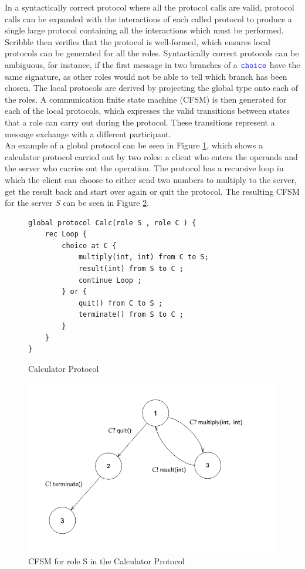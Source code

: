 \documentclass[12pt,twoside]{report}
\begin{document}
In a syntactically correct protocol where all the protocol calls are valid, protocol calls can be expanded with the interactions of each called protocol to produce a single large protocol containing all the interactions which must be performed. Scribble then verifies that the protocol is well-formed, which ensures local protocols can be generated for all the roles. Syntactically correct protocols can be ambiguous, for instance, if the first message in two branches of a ${\color{blue}\mathtt{choice}}$ have the same signature, as other roles would not be able to tell which branch has been chosen. The local protocols are derived by projecting the global type onto each of the roles. A communication finite state machine (CFSM) is then generated for each of the local protocols, which expresses the valid transitions between states that a role can carry out during the protocol. These transitions represent a message exchange with a different participant.\\

An example of a global protocol can be seen in Figure \ref{scribble_protocol}, which shows a calculator protocol carried out by two roles: a client who enters the operands and the server who carries out the operation. The protocol has a recursive loop in which the client can choose to either send two numbers to multiply to the server, get the result back and start over again or quit the protocol. The resulting CFSM for the server $S$ can be seen in Figure \ref{scribble_fsm}.\\

\begin{figure}[h]
    \centering
    \lstset{language=Scribble}
    \begin{lstlisting}
global protocol Calc(role S , role C ) {
    rec Loop {
    	choice at C {
    		multiply(int, int) from C to S;
    		result(int) from S to C ;
    		continue Loop ;
    	} or {
    		quit() from C to S ;
    		terminate() from S to C ;
    	}
    }
}
    \end{lstlisting}
    \caption{Calculator Protocol}
    \label{scribble_protocol}
\end{figure}{}

\begin{figure}[h!]
    \centering
    \includegraphics[scale=0.53]{scribble_fsm.png}
    \caption{CFSM for role S in the Calculator Protocol}
    \label{scribble_fsm}
\end{figure}{}
\end{document}
